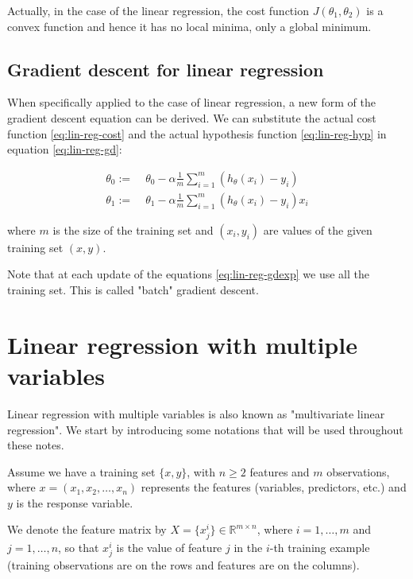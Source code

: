 \documentclass[a4paper,11pt]{report}
\begin{document}
Actually, in the case of the linear regression, the cost function $J(\theta_1, \theta_2)$ is a convex function and hence it has no local minima, only a global minimum.

\subsection*{Gradient descent for linear regression}

When specifically applied to the case of linear regression, a new form of the gradient descent equation can be derived. We can substitute the actual cost function \eqref{eq:lin-reg-cost}
and the actual hypothesis function \eqref{eq:lin-reg-hyp} in equation \eqref{eq:lin-reg-gd}:

\begin{equation}\label{eq:lin-reg-gdexp}
\begin{split}
  \theta_0 := & \;\theta_0 - \alpha \frac{1}{m} \sum\limits_{i=1}^{m}(h_\theta(x_{i}) - y_{i}) \\
  \theta_1 := & \;\theta_1 - \alpha \frac{1}{m} \sum\limits_{i=1}^{m}(h_\theta(x_{i}) - y_{i}) x_{i}
\end{split}
\end{equation}

where $m$ is the size of the training set and $(x_{i}, y_{i})$ are values of the given training set $(x, y)$.

Note that at each update of the equations \eqref{eq:lin-reg-gdexp} we use all the training set. This is called "batch" gradient descent.



\section{Linear regression with multiple variables}\label{sec:mul-reg}

Linear regression with multiple variables is also known as "multivariate linear regression".
We start by introducing some notations that will be used throughout these notes.

Assume we have a training set $\{x, y\}$, with $n \geq 2$ features and $m$ observations, where \newline
$x = (x_1, x_2, \ldots, x_n)$ represents the features (variables, predictors, etc.) and $y $ is the response variable.

We denote the feature matrix by $X = \{x_j^i\}\in\mathbb{R}^{m\times n}$, where $i=1,\ldots, m$ and $j=1,\ldots, n$, so that $x_j^i$ is the value of feature $j$ in the $i$-th training example
(training observations are on the rows and features are on the columns).
\end{document}
